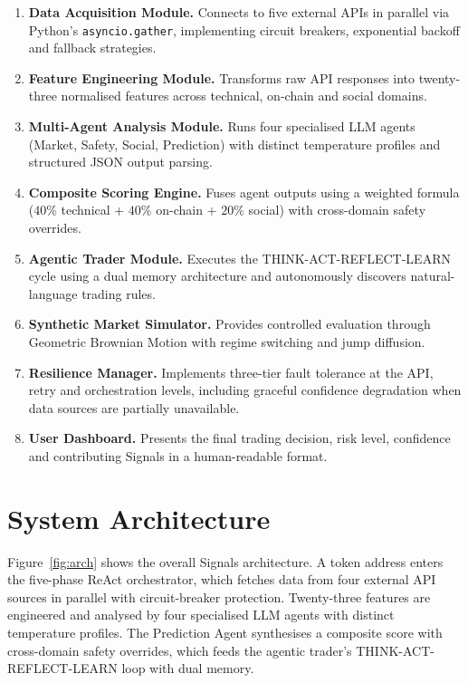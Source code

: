 \documentclass[12pt,a4paper,oneside,openany]{book}
\begin{document}
\begin{enumerate}[leftmargin=12mm]
\item \textbf{Data Acquisition Module.} Connects to five external APIs in parallel via Python's \texttt{asyncio.gather}, implementing circuit breakers, exponential backoff and fallback strategies.
\item \textbf{Feature Engineering Module.} Transforms raw API responses into twenty-three normalised features across technical, on-chain and social domains.
\item \textbf{Multi-Agent Analysis Module.} Runs four specialised LLM agents (Market, Safety, Social, Prediction) with distinct temperature profiles and structured JSON output parsing.
\item \textbf{Composite Scoring Engine.} Fuses agent outputs using a weighted formula ($40\%$ technical + $40\%$ on-chain + $20\%$ social) with cross-domain safety overrides.
\item \textbf{Agentic Trader Module.} Executes the THINK-ACT-REFLECT-LEARN cycle using a dual memory architecture and autonomously discovers natural-language trading rules.
\item \textbf{Synthetic Market Simulator.} Provides controlled evaluation through Geometric Brownian Motion with regime switching and jump diffusion.
\item \textbf{Resilience Manager.} Implements three-tier fault tolerance at the API, retry and orchestration levels, including graceful confidence degradation when data sources are partially unavailable.
\item \textbf{User Dashboard.} Presents the final trading decision, risk level, confidence and contributing Signals in a human-readable format.
\end{enumerate}

\section{System Architecture}
Figure~\ref{fig:arch} shows the overall Signals architecture. A token address enters the five-phase ReAct orchestrator, which fetches data from four external API sources in parallel with circuit-breaker protection. Twenty-three features are engineered and analysed by four specialised LLM agents with distinct temperature profiles. The Prediction Agent synthesises a composite score with cross-domain safety overrides, which feeds the agentic trader's THINK-ACT-REFLECT-LEARN loop with dual memory.
\end{document}

